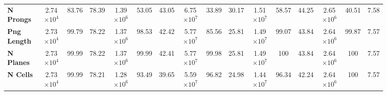\begin{figure}
\begin{scriptsize}
\begin{tabular}{|l|ccc|ccc|ccc|ccc|ccc|}
\textbf{N Prongs}        & 2.74$\times 10^4$           & 83.76                                                               & 78.39                                      & 1.39$\times 10^6$             & 53.05                                                                 & 43.05                                        & 6.75$\times 10^7$              & 33.89                                                                  & 30.17                                         & 1.51$\times 10^7$          & 58.57                                                              & 44.25                                     & 2.65$\times 10^6$ & 40.51                                                                 & 7.58                                         \\
\textbf{Png Length}  & 2.73$\times 10^4$           & 99.79                                                               & 78.22                                      & 1.37$\times 10^6$             & 98.53                                                                 & 42.42                                        & 5.77$\times 10^7$ & 85.56                                                                  & 25.81                                         & 1.49$\times 10^7$          & 99.07                                                              & 43.84                                     & 2.64$\times 10^6$             & 99.87                                                                 & 7.57                                         \\
\textbf{N Planes}      & 2.73$\times 10^4$           & 99.99                                                               & 78.22                                      & 1.37$\times 10^6$             & 99.99                                                                 & 42.41                                        & 5.77$\times 10^7$              & 99.98                                                                  & 25.81                                         & 1.49$\times 10^7$          & 100                                                             & 43.84                                     & 2.64$\times 10^6$ & 100                                                                & 7.57                                         \\
\textbf{N Cells}       & 2.73$\times 10^4$           & 99.99                                                               & 78.21                                      & 1.28$\times 10^6$             & 93.49                                                                 & 39.65                                        & 5.59$\times 10^7$ & 96.82                                                                  & 24.98                                         & 1.44$\times 10^7$          & 96.34                                                              & 42.24                                     & 2.64$\times 10^6$             & 100                                                                & 7.57                                         \\

\end{tabular}
\end{scriptsize}
\end{figure}
